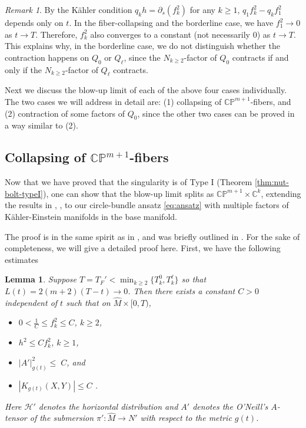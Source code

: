 \documentclass[11pt]{amsart}
\theoremstyle{plain}
\numberwithin{equation}{section}
\newtheorem{lemma}[theorem]{Lemma}
\theoremstyle{definition}
\theoremstyle{remark}
\newtheorem*{remarkx}{Remark}
\begin{document}
\begin{remarkx}
By the K\"ahler condition $q_k h = \partial_s (f_k^2)$ for any $k \geq 1$, $q_1f_k^2-q_k f_1^2$ depends only on $t$. In the fiber-collapsing and the borderline case, we have $f_1^2 \to 0$ as $t \to T$. Therefore, $f_k^2$ also converges to a constant (not necessarily $0$) as $t \to T$. This explains why, in the borderline case, we do not distinguish whether the contraction happens on $Q_0$ or $Q_\ell$, since the $N_{k \geq 2}$-factor of $Q_0$ contracts if and only if the $N_{k\geq 2}$-factor of $Q_{\ell}$ contracts.
\end{remarkx}

Next we discuss the blow-up limit of each of the above four cases individually. The two cases we will address in detail are: (1) collapsing of $\mathbb{CP}^{m+1}$-fibers, and (2) contraction of some factors of $Q_0$, since the other two cases can be proved in a way similar to (2).

\subsection{Collapsing of $\mathbb{CP}^{m+1}$-fibers}

Now that we have proved that the singularity is of Type I (Theorem \ref{thm:nut-bolt-typeI}), one can show that the blow-up limit splits as $\mathbb{CP}^{m+1} \times \mathbb{C}^k$, extending the results in \cite{F}, \cite{JST}, \cite{FT} to our circle-bundle ansatz \eqref{eq:ansatz} with multiple factors of K\"ahler-Einstein manifolds in the base manifold.

The proof is in the same spirit as in \cite{F}, and was briefly outlined in \cite{FT}. For the sake of completeness, we will give a detailed proof here. First, we have the following estimates

\begin{lemma}
\label{lma:fiber-collapsing-estimates}
Suppose $T = T_F' < \min_{k \geq 2} \{T_k^0, T_k^\ell\}$ so that $L (t) = 2 ( m + 2 ) ( T - t ) \to 0$. Then there exists a constant $C > 0$ independent of $t$ such that on $\widehat{M} \times [0,T)$,
\begin{itemize}
\item[(i)]	$0 < \frac{1}{C} \leq f_k^2 \leq C$, \;$k \geq 2$,
\item[(ii)] $h^2 \leq Cf_k^2$, \;$k \geq 1$,
\item[(iii)] $\big| A' \big|_{g (t)}^2 \leq\; C$, and
\item[(iv)] $|K_{g(t)}(X,Y)| \leq C$ .
\end{itemize}
Here $\mathcal{H}'$ denotes the horizontal distribution and $A'$ denotes the O'Neill's $A$-tensor of the submersion $\widehat{\pi}' : \widehat{M} \to N'$ with respect to the metric $g(t)$.

\end{lemma}
\end{document}
